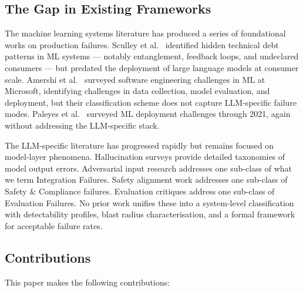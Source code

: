 \documentclass{article}
\begin{document}
\subsection{The Gap in Existing Frameworks}

The machine learning systems literature has produced a series of foundational
works on production failures.  Sculley et al.\ \citep{sculley2015debt} identified
hidden technical debt patterns in ML systems --- notably entanglement, feedback
loops, and undeclared consumers --- but predated the deployment of large
language models at consumer scale.  Amershi et al.\ \citep{amershi2019se4ml}
surveyed software engineering challenges in ML at Microsoft, identifying
challenges in data collection, model evaluation, and deployment, but their
classification scheme does not capture LLM-specific failure modes.  Paleyes
et al.\ \citep{paleyes2022challenges} surveyed ML deployment challenges
through 2021, again without addressing the LLM-specific stack.

The LLM-specific literature has progressed rapidly but remains focused on
model-layer phenomena.  Hallucination surveys
\citep{ji2023hallucination, huang2023survey} provide detailed taxonomies of
model output errors.  Adversarial input research
\citep{wei2023jailbroken, perez2022injection, greshake2023indirect} addresses
one sub-class of what we term Integration Failures.  Safety alignment work
\citep{bai2022constitutional} addresses one sub-class of Safety \& Compliance
failures.  Evaluation critiques \citep{bowman2021nlu, liang2022helm,
ribeiro2020checklist} address one sub-class of Evaluation Failures.
No prior work unifies these into a system-level classification with
detectability profiles, blast radius characterisation, and a formal framework
for acceptable failure rates.

\subsection{Contributions}

This paper makes the following contributions:
\end{document}
